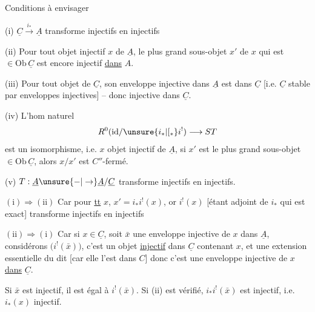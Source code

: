 Conditions à envisager

(i) $\underline C\xrightarrow{i_*}\underline A$ transforme injectifs en injectifs


(ii) Pour tout objet injectif $x$ de $\underline A$, le plus grand sous-objet $x'$ de $x$ qui est $\in\mathrm{Ob}\,\underline C$ est encore injectif \uline{dans} $A$.

(iii) Pour tout objet de $\underline C$, son enveloppe injective dans $\underline A$ est dans $\underline C$ [i.e. $\underline C$ stable par enveloppes injectives] -- donc  injective dans $\underline C$.

\diagram{\begin{tikzcd}[ampersand replacement=\&,row sep=1.2em,column sep=1em]
{} \arrow[d] \arrow[dd,bend right=22,Rightarrow] \& \\ {} \& \\ {} \&
\end{tikzcd}}

(iv)  L'hom naturel
\[
R^0(\mathrm{id}/\unsure{i_*|[{}_*}i^!)\longrightarrow ST
\]
est un isomorphisme, i.e.  $x$ objet injectif de $\underline A$,  si $x'$  est le plus grand sous-objet $\in\mathrm{Ob}\,\underline C$, alors $x/x'$ est $C''$-fermé.


(v) $T:\underline A\unsure{\mathord{-}|\to}\underline A/\underline C$ transforme injectifs en injectifs.

$(\mathrm{i})\Rightarrow(\mathrm{ii})$ Car  pour \uline{tt} $x$, $x'=i_*i^!(x)$, or $i^!(x)$ [étant adjoint de $i_*$ qui est exact] transforme injectifs en injectifs

$(\mathrm{ii})\Rightarrow(\mathrm{i})$ Car si $x\in\underline C$, soit $\bar x$ une enveloppe injective de $x$ dans $\underline A$,  considérons $\bigl(i^!(\bar x)\bigr)$, c'est un objet \uline{injectif} dans $\underline C$ contenant $x$, et une extension essentielle du dit [car elle l'est dans $C$] donc c'est une enveloppe injective de $x$ \uline{dans} $\underline C$.

Si $\bar x$ est injectif, il est  égal à $i^!(\bar x)$. Si (ii) est vérifié, $i_*i^!(\bar x)$ est injectif, i.e. $i_*(x)$ injectif.


